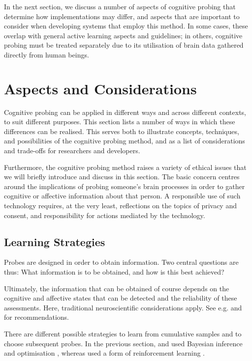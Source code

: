 In the next section, we discuss a number of aspects of cognitive probing that determine how implementations may differ, and aspects that are important to consider when developing systems that employ this method. In some cases, these overlap with general active learning aspects and guidelines; in others, cognitive probing must be treated separately due to its utilisation of brain data gathered directly from human beings.


\section{Aspects and Considerations}
\label{sec:aspects}

Cognitive probing can be applied in different ways and across different contexts, to suit different purposes. This section lists a number of ways in which these differences can be realised. This serves both to illustrate concepts, techniques, and possibilities of the cognitive probing method, and as a list of considerations and trade-offs for researchers and developers.

Furthermore, the cognitive probing method raises a variety of ethical issues that we will briefly introduce and discuss in this section. The basic concern centres around the implications of probing someone's brain processes in order to gather cognitive or affective information about that person. A responsible use of such technology requires, at the very least, reflections on the topics of privacy and consent, and responsibility for actions mediated by the technology. 


\subsection{Learning Strategies}
\label{sec:strategy}

Probes are designed in order to obtain information. Two central questions are thus: What information is to be obtained, and how is this best achieved?

Ultimately, the information that can be obtained of course depends on the cognitive and affective states that can be detected and the reliability of these assessments. Here, traditional neuroscientific considerations apply. See e.g.  and  for recommendations.

There are different possible strategies to learn from cumulative samples and to choose subsequent probes. In the previous section,  and 
used Bayesian inference and optimisation \cite{snoek2012bayesianoptimization}, whereas  used a form of reinforcement learning \cite{sutton1998reinforcementlearning}. 


